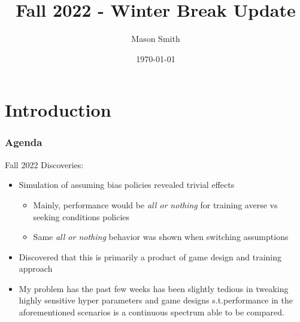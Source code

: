 \documentclass[aspectratio=1610, xcolor=dvipsnames]{packages/beamer}
\title{Fall 2022 - Winter Break Update}\author{Mason Smith}\date\today
\newcommand{\displayTOC}{\begin{frame}\frametitle{Agenda} \tableofcontents[currentsection, subsectionstyle=show/show/hide]\end{frame}}
\begin{document}
\begin{frame}[plain]\titlepage\end{frame}


\begin{acronym}
\end{acronym}




\section{Introduction} \displayTOC

\begin{frame}{Fall 2022 Discoveries:}
    \begin{itemize}
        \item Simulation of assuming bias policies revealed trivial effects
        \begin{itemize}
            \item Mainly, performance would be \textit{ all or nothing} for training averse vs seeking conditions policies
            \item Same \textit{all or nothing} behavior was shown when switching assumptions
        \end{itemize}
        \item Discovered that this is primarily a product of game design and training approach
        \item My problem has the past few weeks has been slightly tedious in tweaking highly sensitive hyper parameters
        and game designs s.t.performance in the aforementioned scenarios is a continuous spectrum able to be compared.
    \end{itemize}
\end{frame}
\end{document}
